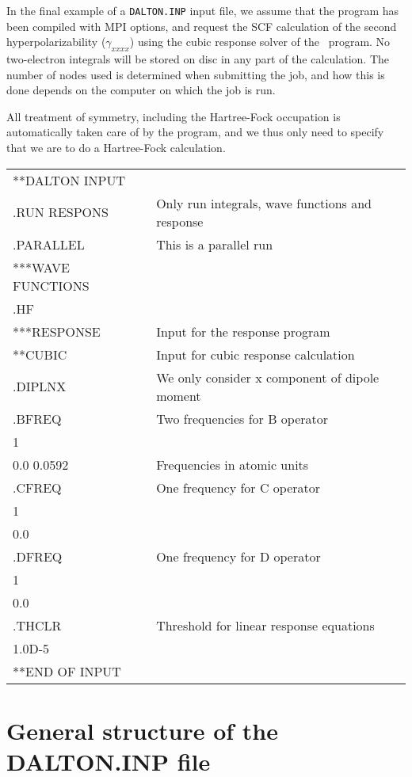 In the final example of a \verb|DALTON.INP| input file, we assume that
the program has been compiled with MPI options, and request the SCF
calculation of the second hyperpolarizability  ($\gamma_{xxxx}$) using
the cubic response solver of the \resp\
program. No two-electron
integrals will be stored on disc in any part of the calculation. The
number of nodes\index{node} used is determined when submitting the
job, and how
this is done depends on the computer on which the job is run.

All treatment  of symmetry, including the Hartree-Fock
occupation is
automatically taken care of by the program, and we thus only need to
specify that we are to do a Hartree-Fock calculation.

{\ttfamily
\begin{tabular}{ll}
**DALTON INPUT\\
.RUN RESPONS\hspace{4cm} & Only run integrals, wave functions and
response\\
.PARALLEL & This is a parallel run\\
***WAVE FUNCTIONS\\
.HF\\
***RESPONSE & Input for the response program\\
**CUBIC & Input for cubic response calculation\\
.DIPLNX & We only consider x component of dipole moment\\
.BFREQ & Two frequencies for B operator\\
 1\\
 0.0 0.0592& Frequencies in atomic units\\
.CFREQ & One frequency for C operator\\
 1\\
 0.0\\
.DFREQ & One frequency for D operator\\
 1\\
 0.0\\
.THCLR & Threshold for linear response equations\\
 1.0D-5\\
**END OF INPUT\\
\end{tabular}}

\section{General structure of the DALTON.INP file}\label{sec:inputstructure}

